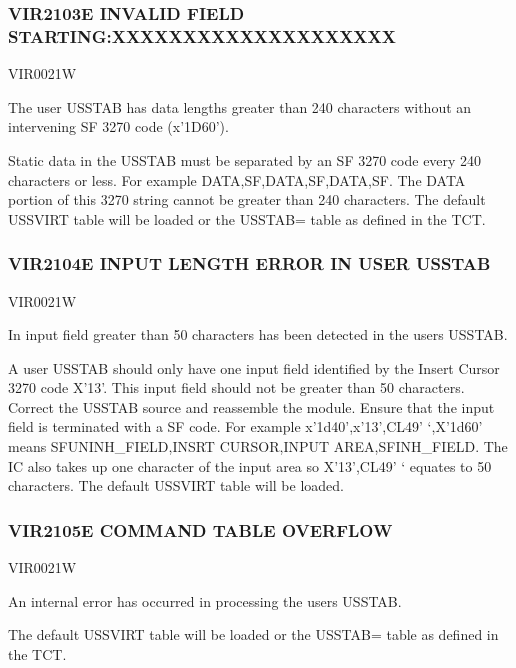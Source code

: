 \documentclass[letterpaper,10pt,english]{sphinxmanual}
\begin{document}
\subsubsection{VIR2103E INVALID FIELD STARTING:XXXXXXXXXXXXXXXXXXXX}
\label{\detokenize{messages:vir2103e-invalid-field-starting-xxxxxxxxxxxxxxxxxxxx}}\begin{description}
\sphinxAtStartPar
VIR0021W

\sphinxAtStartPar
The user USSTAB has data lengths greater than 240 characters without an intervening SF 3270 code (x’1D60’).

\sphinxAtStartPar
Static data in the USSTAB must be separated by an SF 3270 code every 240 characters or less. For example DATA,SF,DATA,SF,DATA,SF. The DATA portion of this 3270 string cannot be greater than 240 characters. The default USSVIRT table will be loaded or the USSTAB= table as defined in the TCT.

\end{description}


\subsubsection{VIR2104E INPUT LENGTH ERROR IN USER USSTAB}
\label{\detokenize{messages:vir2104e-input-length-error-in-user-usstab}}\begin{description}
\sphinxAtStartPar
VIR0021W

\sphinxAtStartPar
In input field greater than 50 characters has been detected in the users USSTAB.

\sphinxAtStartPar
A user USSTAB should only have one input field identified by the Insert Cursor 3270 code X’13’. This input field should not be greater than 50 characters. Correct the USSTAB source and reassemble the module. Ensure that the input field is terminated with a SF code. For example x’1d40’,x’13’,CL49’ ‘,X’1d60’ means SFUNINH\_FIELD,INSRT CURSOR,INPUT AREA,SFINH\_FIELD. The IC also takes up one character of the input area so X’13’,CL49’ ‘ equates to 50 characters. The default USSVIRT table will be loaded.

\end{description}


\subsubsection{VIR2105E COMMAND TABLE OVERFLOW}
\label{\detokenize{messages:vir2105e-command-table-overflow}}\begin{description}
\sphinxAtStartPar
VIR0021W

\sphinxAtStartPar
An internal error has occurred in processing the users USSTAB.

\sphinxAtStartPar
The default USSVIRT table will be loaded or the USSTAB= table as defined in the TCT.

\end{description}
\end{document}
